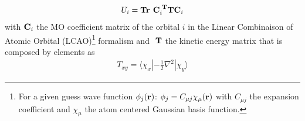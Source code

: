 \documentclass[twocolumn, a4paper, twoside,10pt]{scrartcl}
\begin{document}
\begin{align}
   U_i = \textrm{\bfseries Tr } \textrm{\bfseries C}_i^\textrm{ \bfseries T} \textrm{\bfseries T} \textrm{\bfseries C}_i
\end{align}
with $\textrm{\bfseries C}_i$ the MO coefficient matrix of the orbital $i$ in the Linear Combinaison of Atomic Orbital (LCAO)\footnote{For a given guess wave function $\phi_j(\textrm{\bfseries r})$: $\phi_j = C_{\mu j}\chi_\mu(\textrm{\bfseries r})$ with $C_{\mu j}$ the expansion coefficient and $\chi_\mu$ the atom centered Gaussian basis function.} formalism and $\textrm{ \bfseries T}$ the kinetic energy matrix that is composed by elements as
 \begin{align}
T_{xy} = \langle \chi_x | -\frac{1}{2}\nabla^2 | \chi_y \rangle
\end{align}
\end{document}
